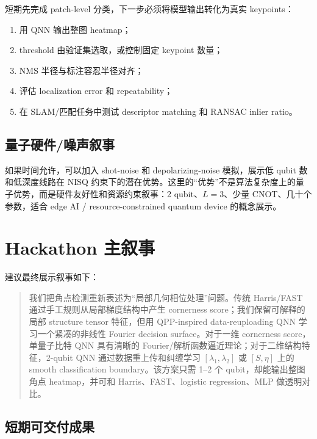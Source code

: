 \documentclass[UTF8,zihao=-4]{ctexart}
\begin{document}
短期先完成 patch-level 分类，下一步必须将模型输出转化为真实 keypoints：
\begin{enumerate}[leftmargin=2.0em]
    \item 用 QNN 输出整图 heatmap；
    \item threshold 由验证集选取，或控制固定 keypoint 数量；
    \item NMS 半径与标注容忍半径对齐；
    \item 评估 localization error 和 repeatability；
    \item 在 SLAM/匹配任务中测试 descriptor matching 和 RANSAC inlier ratio。
\end{enumerate}

\subsection{量子硬件/噪声叙事}

如果时间允许，可以加入 shot-noise 和 depolarizing-noise 模拟，展示低 qubit 数和低深度线路在 NISQ 约束下的潜在优势。这里的“优势”不是算法复杂度上的量子优势，而是硬件友好性和资源约束叙事：2 qubit、$L=3$、少量 CNOT、几十个参数，适合 edge AI / resource-constrained quantum device 的概念展示。

\section{Hackathon 主叙事}

建议最终展示叙事如下：

\begin{quote}
我们把角点检测重新表述为“局部几何相位处理”问题。传统 Harris/FAST 通过手工规则从局部梯度结构中产生 cornerness score；我们保留可解释的局部 structure tensor 特征，但用 QPP-inspired data-reuploading QNN 学习一个紧凑的非线性 Fourier decision surface。对于一维 cornerness score，单量子比特 QNN 具有清晰的 Fourier/解析函数逼近理论；对于二维结构特征，2-qubit QNN 通过数据重上传和纠缠学习 $[\lambda_1,\lambda_2]$ 或 $[S,\eta]$ 上的 smooth classification boundary。该方案只需 1--2 个 qubit，却能输出整图角点 heatmap，并可和 Harris、FAST、logistic regression、MLP 做透明对比。
\end{quote}

\subsection{短期可交付成果}
\end{document}
